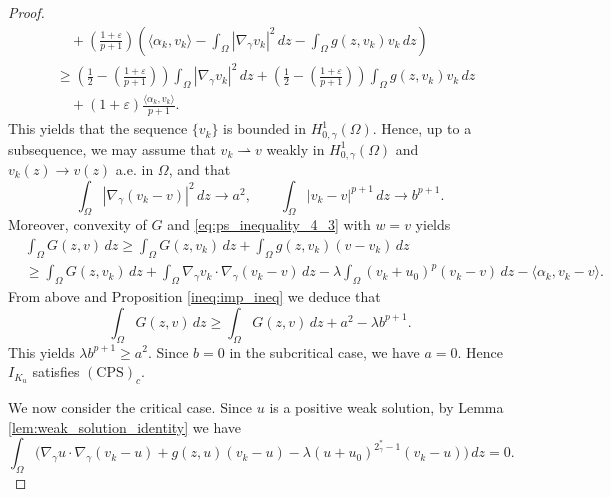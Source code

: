 \documentclass[11pt]{article}
\newcommand{\om} {\Omega}
\newcommand{\gradgr}{\nabla_{\gamma}}
\newcommand{\spacegr}{H^{1}_{0,\gamma}(\Omega)}
\begin{document}
\begin{proof}
\begin{align*}
&\quad + \left(\frac{1+\varepsilon}{p+1}\right) \left(
\langle \alpha_k, v_k \rangle
- \int_{\Omega} |\gradgr v_k|^2\, dz
- \int_{\Omega} g(z, v_k) v_k\, dz
\right)\\
& \geq \left( \frac{1}{2} - \left(\frac{1+\varepsilon}{p+1}\right) \right) \int_{\om} |\gradgr v_k|^2\, dz 
+ \left( \frac{1}{2} - \left(\frac{1+\varepsilon}{p+1} \right) \right) \int_{\Omega} g(z, v_k) v_k\, dz \\
& \quad  + (1 + \varepsilon) \frac{\langle \alpha_k, v_k \rangle}{p+1}.
\end{align*}
This yields that the sequence $\{v_k\}$ is bounded in $\spacegr$. Hence, up to a subsequence, we may assume that $v_k \rightharpoonup v$ weakly in $\spacegr$ and $v_k(z) \to v(z)$ a.e. in $\Omega$, and that
\[
\int_{\Omega} |\gradgr (v_k - v)|^2\, dz \to a^2,
\qquad
\int_{\Omega} |v_k - v|^{p+1}\, dz \to b^{p+1}.
\]
Moreover, convexity of $G$ and \eqref{eq:ps_inequality_4_3} with $w = v$ yields
\begin{equation*}
\begin{aligned}
&\int_{\Omega} G(z, v)\, dz
\ge \int_{\Omega} G(z, v_k)\, dz
+ \int_{\Omega} g(z, v_k) (v - v_k)\, dz \\
&\ge \int_{\Omega} G(z, v_k)\, dz
+ \int_{\Omega} \gradgr v_k \cdot \gradgr (v_k - v)\, dz - \lambda \int_{\Omega} (v_k + u_{0})^p (v_k - v)\, dz
- \langle \alpha_k, v_k - v \rangle.
\end{aligned}
\end{equation*}
From above and Proposition \ref{ineq:imp_ineq} we deduce that
\begin{equation*}
\int_{\Omega} G(z, v)\, dz
\ge \int_{\Omega} G(z, v)\, dz + a^2 - \lambda b^{p+1}.
\end{equation*}
This yields $\lambda b^{p+1} \ge a^2$. Since $b=0$ in the subcritical case, we have $a = 0$. Hence $I_{K_u}$ satisfies $(\mathrm{CPS})_c$.

We now consider the critical case. Since $u$ is a positive weak solution, by Lemma \ref{lem:weak_solution_identity} we have
\begin{equation}
\label{eq:critical_identity_4_4}
\int_{\Omega} \bigl(
\gradgr u \cdot \gradgr (v_k - u)
+ g(z, u) (v_k - u)
- \lambda (u + u_{0})^{2_{\gamma}^* - 1} (v_k - u)
\bigr)\, dz = 0 .
\end{equation}


\end{proof}
\end{document}
